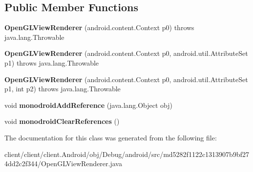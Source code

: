 \subsection*{Public Member Functions}
\begin{DoxyCompactItemize}
\item 
\hypertarget{classmd5282f1122c1313907b9bf274dd2c2f344_1_1OpenGLViewRenderer_abacf055d37ef634dce5fa693ac84859b}{}{\bfseries Open\+G\+L\+View\+Renderer} (android.\+content.\+Context p0)  throws java.\+lang.\+Throwable 	\label{classmd5282f1122c1313907b9bf274dd2c2f344_1_1OpenGLViewRenderer_abacf055d37ef634dce5fa693ac84859b}

\item 
\hypertarget{classmd5282f1122c1313907b9bf274dd2c2f344_1_1OpenGLViewRenderer_a45e4c2c3998551980d187f76c3324ff4}{}{\bfseries Open\+G\+L\+View\+Renderer} (android.\+content.\+Context p0, android.\+util.\+Attribute\+Set p1)  throws java.\+lang.\+Throwable 	\label{classmd5282f1122c1313907b9bf274dd2c2f344_1_1OpenGLViewRenderer_a45e4c2c3998551980d187f76c3324ff4}

\item 
\hypertarget{classmd5282f1122c1313907b9bf274dd2c2f344_1_1OpenGLViewRenderer_a479856264048323a3843f1e95d1c369e}{}{\bfseries Open\+G\+L\+View\+Renderer} (android.\+content.\+Context p0, android.\+util.\+Attribute\+Set p1, int p2)  throws java.\+lang.\+Throwable 	\label{classmd5282f1122c1313907b9bf274dd2c2f344_1_1OpenGLViewRenderer_a479856264048323a3843f1e95d1c369e}

\item 
\hypertarget{classmd5282f1122c1313907b9bf274dd2c2f344_1_1OpenGLViewRenderer_adc7dd537fae5d2bd194c57e8e3775963}{}void {\bfseries monodroid\+Add\+Reference} (java.\+lang.\+Object obj)\label{classmd5282f1122c1313907b9bf274dd2c2f344_1_1OpenGLViewRenderer_adc7dd537fae5d2bd194c57e8e3775963}

\item 
\hypertarget{classmd5282f1122c1313907b9bf274dd2c2f344_1_1OpenGLViewRenderer_a55545b2f7a5511f26d60807ceebe1c7e}{}void {\bfseries monodroid\+Clear\+References} ()\label{classmd5282f1122c1313907b9bf274dd2c2f344_1_1OpenGLViewRenderer_a55545b2f7a5511f26d60807ceebe1c7e}

\end{DoxyCompactItemize}


The documentation for this class was generated from the following file\+:\begin{DoxyCompactItemize}
\item 
client/client/client.\+Android/obj/\+Debug/android/src/md5282f1122c1313907b9bf274dd2c2f344/Open\+G\+L\+View\+Renderer.\+java\end{DoxyCompactItemize}
